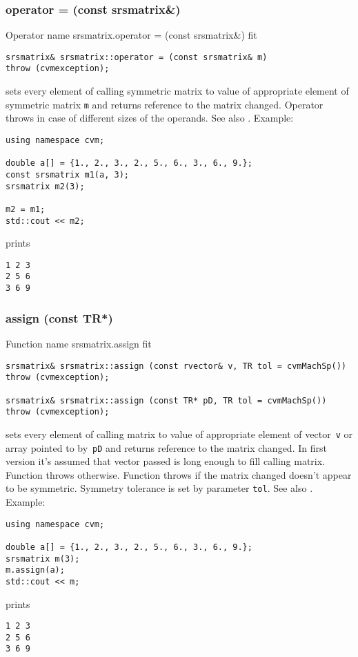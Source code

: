 \subsubsection{operator = (const srsmatrix\&)}
Operator%
\pdfdest name {srsmatrix.operator = (const srsmatrix&)} fit
\begin{verbatim}
srsmatrix& srsmatrix::operator = (const srsmatrix& m)
throw (cvmexception);
\end{verbatim}
sets every element of  calling symmetric matrix to  value of
appropriate element of symmetric matrix \verb"m"
and returns  reference to
the matrix changed.
Operator throws  
in case of different sizes of the operands.
See also .
Example:
\begin{Verbatim}
using namespace cvm;

double a[] = {1., 2., 3., 2., 5., 6., 3., 6., 9.};
const srsmatrix m1(a, 3);
srsmatrix m2(3);

m2 = m1;
std::cout << m2;
\end{Verbatim}
prints
\begin{Verbatim}
1 2 3
2 5 6
3 6 9
\end{Verbatim}
\newpage



\subsubsection{assign (const TR*)}
Function%
\pdfdest name {srsmatrix.assign} fit
\begin{verbatim}
srsmatrix& srsmatrix::assign (const rvector& v, TR tol = cvmMachSp())
throw (cvmexception);

srsmatrix& srsmatrix::assign (const TR* pD, TR tol = cvmMachSp())
throw (cvmexception);
\end{verbatim}
sets every element of  calling matrix to  value of
appropriate element of  vector~\verb'v'
or  array pointed to by~\verb"pD"
and returns  reference to
the matrix changed.
In first version it's assumed that vector passed is long
enough to fill calling matrix. Function throws  
otherwise.
Function throws  
if the matrix changed doesn't appear to be symmetric.
Symmetry tolerance is set by parameter \verb'tol'.
See also .
Example:
\begin{Verbatim}
using namespace cvm;

double a[] = {1., 2., 3., 2., 5., 6., 3., 6., 9.};
srsmatrix m(3);
m.assign(a);
std::cout << m;
\end{Verbatim}
prints
\begin{Verbatim}
1 2 3
2 5 6
3 6 9
\end{Verbatim}
\newpage



